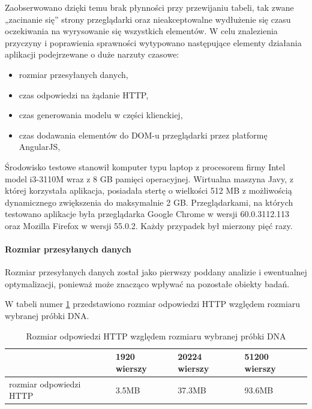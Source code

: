 \documentclass[a4paper,12pt,twoside]{article}
\begin{document}
Zaobserwowano dzięki temu brak płynności przy przewijaniu tabeli, tak zwane „zacinanie się” strony przeglądarki oraz nieakceptowalne wydłużenie się
czasu oczekiwania na wyrysowanie się wszystkich elementów.
W celu znalezienia przyczyny i poprawienia sprawności
wytypowano następujące elementy działania aplikacji podejrzewane o duże narzuty czasowe:

\begin{itemize}
\item rozmiar przesyłanych danych,
\item czas odpowiedzi na żądanie HTTP,
\item czas generowania modelu w części klienckiej,
\item czas dodawania elementów do DOM-u przeglądarki przez platformę AngularJS,
\end{itemize}

Środowisko testowe stanowił komputer typu laptop z
procesorem firmy Intel model i3-3110M wraz z 8 GB pamięci operacyjnej.
Wirtualna maszyna Javy, z której korzystała aplikacja, posiadała stertę
o wielkości 512 MB z możliwością dynamicznego zwiększenia do maksymalnie 2 GB.
Przeglądarkami, na których testowano aplikacje była przeglądarka
Google Chrome w wersji 60.0.3112.113 oraz Mozilla Firefox w wersji 55.0.2.
Każdy przypadek był mierzony pięć razy.
\newpage
\paragraph{Rozmiar przesyłanych danych}
Rozmiar przesyłanych danych został jako pierwszy poddany analizie i
ewentualnej optymalizacji, ponieważ może znacząco wpływać na pozostałe
obiekty badań.

W tabeli numer \ref{table:requestSizeNoOpt} przedstawiono rozmiar
odpowiedzi HTTP względem rozmiaru wybranej próbki DNA.

\begin{center}
\begin{table} [H]
\begin{tabular}{| p{4cm} | p{2.7cm} | p{2.7cm} | p{2.7cm}|}
\hline
& 1920 wierszy & 20224 wierszy & 51200 wierszy\\
\hline
rozmiar odpowiedzi HTTP& 3.5MB&37.3MB& 93.6MB\\ \hline
\end{tabular}

\caption{Rozmiar odpowiedzi HTTP względem rozmiaru wybranej próbki DNA}
\label{table:requestSizeNoOpt}
\end{table}
\end{center}
\end{document}
